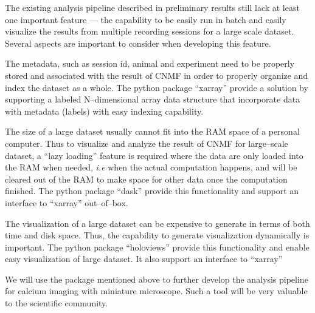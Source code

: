 \documentclass[master.tex]{subfiles}
\begin{document}
The existing analysis pipeline described in preliminary results still lack at
least one important feature --- the capability to be easily run in batch and
easily visualize the results from multiple recording sessions for a large scale
dataset. Several aspects are important to consider when developing this feature.
\begin{inparaenum}[a)]
\item The metadata, such as session id, animal and experiment need to be
  properly stored and associated with the result of CNMF in order to properly
  organize and index the dataset as a whole. The python package ``xarray''
  provide a solution by supporting a labeled N--dimensional array data structure
  that incorporate data with metadata (labels) with easy indexing capability.
\item The size of a large dataset usually cannot fit into the RAM space of a
  personal computer. Thus to visualize and analyze the result of CNMF for
  large--scale dataset, a ``lazy loading'' feature is required where the data
  are only loaded into the RAM when needed, \textit{i.e} when the actual
  computation happens, and will be cleared out of the RAM to make space for
  other data once the computation finished. The python package ``dask'' provide
  this functionality and support an interface to ``xarray'' out--of--box.
\item The visualization of a large dataset can be expensive to generate in terms
  of both time and disk space. Thus, the capability to generate visualization
  dynamically is important. The python package ``holoviews'' provide this
  functionality and enable easy visualization of large dataset. It also support
  an interface to ``xarray''
\end{inparaenum}
We will use the package mentioned above to further develop the analysis pipeline
for calcium imaging with miniature microscope. Such a tool will be very valuable
to the scientific community.
\end{document}
